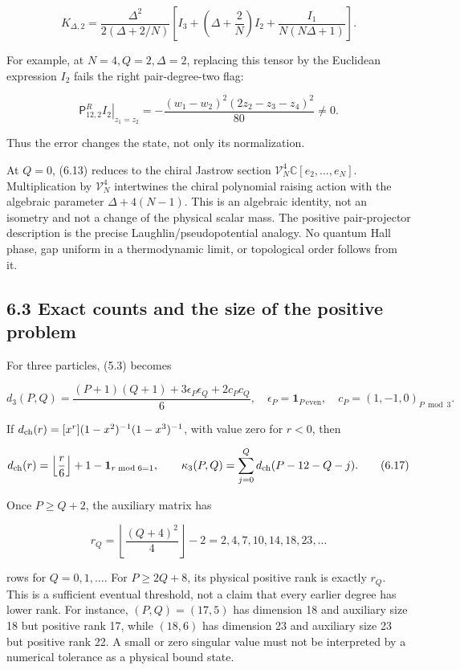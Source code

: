 \[
K_{\Delta,2}=
\frac{\Delta^2}{2(\Delta+2/N)}
\left[I_3+\left(\Delta+\frac2N\right)I_2
+\frac{I_1}{N(N\Delta+1)}\right].
\tag{6.14}
\]

For example, at \(N=4,Q=2,\Delta=2\), replacing this tensor by the Euclidean expression \(I_2\) fails the right pair-degree-two flag:

\[
\left.\mathsf P^R_{12,2}I_2\right|_{z_1=z_2}
=-\frac{(w_1-w_2)^2(2z_2-z_3-z_4)^2}{80}\ne0.
\tag{6.15}
\]

Thus the error changes the state, not only its normalization.

At \(Q=0\), (6.13) reduces to the chiral Jastrow section \(\mathcal V_N^4\mathbb C[e_2,\ldots,e_N]\). Multiplication by \(\mathcal V_N^4\) intertwines the chiral polynomial raising action with the algebraic parameter \(\Delta+4(N-1)\). This is an algebraic identity, not an isometry and not a change of the physical scalar mass. The positive pair-projector description is the precise Laughlin/pseudopotential analogy. No quantum Hall phase, gap uniform in a thermodynamic limit, or topological order follows from it.

\hypertarget{exact-counts-and-the-size-of-the-positive-problem}{%
\subsection{6.3 Exact counts and the size of the positive problem}\label{exact-counts-and-the-size-of-the-positive-problem}}

For three particles, (5.3) becomes

\[
d_3(P,Q)=\frac{(P+1)(Q+1)+3\epsilon_P\epsilon_Q+2c_Pc_Q}{6},
\quad
\epsilon_P=\mathbf1_{P\ \mathrm{even}},\quad c_P=(1,-1,0)_{P\bmod3}.
\tag{6.16}
\]

If \(d_{\rm ch}(r)=[x^r](1-x^2)^{-1}(1-x^3)^{-1}\), with value zero for \(r<0\), then

\[
d_{\rm ch}(r)=\left\lfloor\frac r6\right\rfloor+1-\mathbf1_{r\bmod6=1},
\qquad
\kappa_3(P,Q)=\sum_{j=0}^Qd_{\rm ch}(P-12-Q-j).
\tag{6.17}
\]

Once \(P\ge Q+2\), the auxiliary matrix has

\[
r_Q=\left\lfloor\frac{(Q+4)^2}{4}\right\rfloor-2
=2,4,7,10,14,18,23,\ldots
\tag{6.18}
\]

rows for \(Q=0,1,\ldots\). For \(P\ge2Q+8\), its physical positive rank is exactly \(r_Q\). This is a sufficient eventual threshold, not a claim that every earlier degree has lower rank. For instance, \((P,Q)=(17,5)\) has dimension 18 and auxiliary size 18 but positive rank 17, while \((18,6)\) has dimension 23 and auxiliary size 23 but positive rank 22. A small or zero singular value must not be interpreted by a numerical tolerance as a physical bound state.

